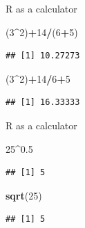 \documentclass[ignorenonframetext,]{beamer}
\newenvironment{Shaded}{\begin{snugshade}}{\end{snugshade}}
\newcommand{\DecValTok}[1]{\textcolor[rgb]{0.00,0.00,0.81}{#1}}
\newcommand{\FloatTok}[1]{\textcolor[rgb]{0.00,0.00,0.81}{#1}}
\newcommand{\KeywordTok}[1]{\textcolor[rgb]{0.13,0.29,0.53}{\textbf{#1}}}
\newcommand{\NormalTok}[1]{#1}
\newcommand{\OperatorTok}[1]{\textcolor[rgb]{0.81,0.36,0.00}{\textbf{#1}}}
\begin{document}
\begin{frame}[fragile]{R as a calculator}
\protect\hypertarget{r-as-a-calculator-1}{}

\begin{Shaded}
\begin{Highlighting}[]
\NormalTok{(}\DecValTok{3}\OperatorTok{^}\DecValTok{2}\NormalTok{)}\OperatorTok{+}\DecValTok{14}\OperatorTok{/}\NormalTok{(}\DecValTok{6}\OperatorTok{+}\DecValTok{5}\NormalTok{)}
\end{Highlighting}
\end{Shaded}

\begin{verbatim}
## [1] 10.27273
\end{verbatim}

\begin{Shaded}
\begin{Highlighting}[]
\NormalTok{(}\DecValTok{3}\OperatorTok{^}\DecValTok{2}\NormalTok{)}\OperatorTok{+}\DecValTok{14}\OperatorTok{/}\DecValTok{6}\OperatorTok{+}\DecValTok{5}
\end{Highlighting}
\end{Shaded}

\begin{verbatim}
## [1] 16.33333
\end{verbatim}

\end{frame}

\begin{frame}[fragile]{R as a calculator}
\protect\hypertarget{r-as-a-calculator-2}{}

\begin{Shaded}
\begin{Highlighting}[]
\DecValTok{25}\OperatorTok{^}\FloatTok{0.5}
\end{Highlighting}
\end{Shaded}

\begin{verbatim}
## [1] 5
\end{verbatim}

\begin{Shaded}
\begin{Highlighting}[]
\KeywordTok{sqrt}\NormalTok{(}\DecValTok{25}\NormalTok{)}
\end{Highlighting}
\end{Shaded}

\begin{verbatim}
## [1] 5
\end{verbatim}

\end{frame}
\end{document}
